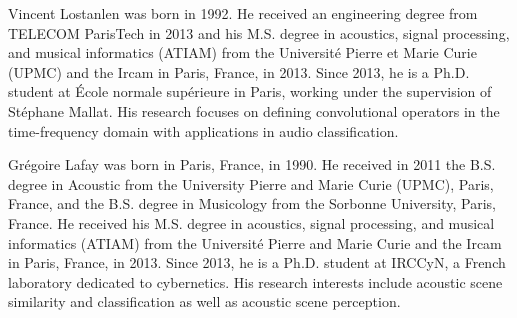 \documentclass[journal]{IEEEtran}
\begin{document}
%
%
\printbibliography

\begin{IEEEbiography}{Vincent Lostanlen} was born in 1992. He received an engineering degree from TELECOM ParisTech in 2013 and his M.S. degree in acoustics, signal processing, and musical informatics (ATIAM) from the Universit\'{e} Pierre et Marie Curie (UPMC) and the Ircam in Paris, France, in 2013. Since 2013, he is a Ph.D. student at \'{E}cole normale sup\'{e}rieure in Paris, working under the supervision of St\'{e}phane Mallat. His research focuses on defining convolutional operators in the time-frequency domain with applications in audio classification.
\end{IEEEbiography}

\begin{IEEEbiography}{Gr\'egoire Lafay} was born in Paris, France, in 1990. He received in 2011 the B.S. degree in Acoustic from the University Pierre and Marie Curie (UPMC), Paris, France, and the B.S. degree in Musicology from the Sorbonne University, Paris, France. He received his M.S. degree in acoustics, signal processing, and musical informatics (ATIAM) from the Universit\'{e} Pierre and Marie Curie and the Ircam in Paris, France, in 2013. Since 2013, he is a Ph.D. student at IRCCyN, a French laboratory dedicated to cybernetics. His research interests include acoustic scene similarity and classification as well as acoustic scene perception. 
\end{IEEEbiography}
\end{document}
